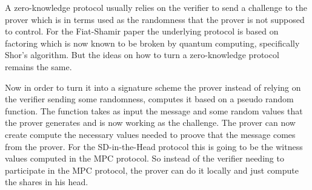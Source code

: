 \documentclass[twoside,11pt,openright]{report}
\theoremstyle{definition}
\theoremstyle{plain}
\begin{document}
A zero-knowledge protocol usually relies on the verifier to send a challenge to the prover which is in terms used as the randomness that the prover is not supposed to control. For the Fiat-Shamir paper the underlying protocol is based on factoring which is now known to be broken by quantum computing, specifically Shor's algorithm. But the ideas on how to turn a zero-knowledge protocol remains the same.

Now in order to turn it into a signature scheme the prover instead of relying on the verifier sending some randomness, computes it based on a pseudo random function. The function takes as input the message and some random values that the prover generates and is now working as the challenge. The prover can now create compute the necessary values needed to proove that the message comes from the prover. For the SD-in-the-Head protocol this is going to be the witness values computed in the MPC protocol. So instead of the verifier needing to participate in the MPC protocol, the prover can do it locally and just compute the shares in his head. 
\end{document}
